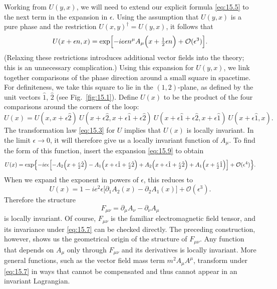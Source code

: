 Working from $U(y,x)$, we will need to extend our explicit formula
\eqref{eq:15.5} to the next term in the expansion in $\epsilon$.  Using the
assumption that $U(y,x)$ is a pure phase and the restriction
$U(x,y)^{\dagger} = U(y,x)$, it follows that
\begin{equation}
  U(x+\epsilon n, x) = \exp\Bigl[ -ie\epsilon n^\mu A_\mu\Bigl( x +
    \tfrac{1}{2}\epsilon n \Bigr) + \mathcal{O}(\epsilon^3) \Bigr] .
  \label{eq:15.9}
\end{equation}
(Relaxing these restrictions introduces additional vector fields into the
theory; this is an unnecessary complication.)  Using this expansion for
$U(y,x)$, we link together comparisons of the phase direction around a small
square in spacetime.  For definiteness, we take this square to lie in the
$(1,2)$-plane, as defined by the unit vectors $\hat{1}$, $\hat{2}$ (see
Fig.~\ref{fig:15.1}).  Define $U(x)$ to be the product of the four
comparisons around the corners of the loop:
\begin{equation}
  U(x) = U(x, x+\epsilon\hat{2})\ U(x+\epsilon\hat{2}, x+\epsilon\hat{1}
    +\epsilon\hat{2})\ U(x+\epsilon\hat{1}+\epsilon\hat{2},
      x+\epsilon\hat{1})\ U(x+\epsilon\hat{1}, x) .
  \label{eq:15.10}
\end{equation}
The transformation law \eqref{eq:15.3} for $U$ implies that $U(x)$ is locally
invariant.  In the limit $\epsilon\to 0$, it will therefore give us a locally
invariant function of $A_\mu$.  To find the form of this function, insert the
expansion \eqref{eq:15.9} to obtain
\begin{equation}
  U(x) = \exp\Bigl\{ -ie\epsilon\Bigl[ -A_2\Bigl( x+\tfrac{\epsilon}{2}\hat{2}
    \Bigr) - A_1\Bigl( x + \epsilon\hat{1} + \tfrac{\epsilon}{2}\hat{2} \Bigr)
      + A_2\Bigl( x + \epsilon\hat{1} + \tfrac{\epsilon}{2}\hat{2} \Bigr)
        + A_1\Bigl( x + \tfrac{\epsilon}{2}\hat{1} \Bigr) \Bigr]
          + \mathcal{O}(\epsilon^4) \Bigr\} .
  \label{eq:15.11}
\end{equation}
When we expand the exponent in powers of $\epsilon$, this reduces to
\begin{equation}
  U(x) = 1 - ie^2\epsilon\bigl[ \partial_1A_2(x) - \partial_2A_1(x) \bigr]
    + \mathcal{O}(\epsilon^3) .
  \label{eq:15.12}
\end{equation}
Therefore the structure
\begin{equation}
  F_{\mu\nu} = \partial_\mu A_\nu - \partial_\nu A_\mu
  \label{eq:15.13}
\end{equation}
is locally invariant.  Of course, $F_{\mu\nu}$ is the familiar electromagnetic
field tensor, and its invariance under \eqref{eq:15.7} can be checked
directly.  The preceding construction, however, shows us the geometrical
origin of the structure of $F_{\mu\nu}$.  Any function that depends on $A_\mu$
only through $F_{\mu\nu}$ and its derivatives is locally invariant.  More
general functions, such as the vector field mass term $m^2A_\mu A^\mu$,
transform under \eqref{eq:15.7} in ways that cannot be compensated and thus
cannot appear in an invariant Lagrangian.

